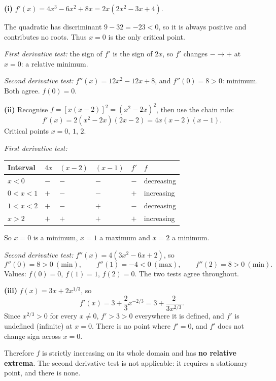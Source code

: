 \begin{solution}
\textbf{(i)} $f'(x)=4x^{3}-6x^{2}+8x=2x\left(2x^{2}-3x+4\right)$.

The quadratic has discriminant $9-32=-23<0$, so it is always positive and
contributes no roots. Thus $x=0$ is the only critical point.

\emph{First derivative test:} the sign of $f'$ is the sign of $2x$, so $f'$
changes $-\to+$ at $x=0$: a relative minimum.

\emph{Second derivative test:} $f''(x)=12x^{2}-12x+8$, and $f''(0)=8>0$:
minimum. Both agree. $f(0)=0$.

\medskip
\textbf{(ii)} Recognise $f=\left[x(x-2)\right]^{2}=(x^{2}-2x)^{2}$, then use the
chain rule:
\[
f'(x)=2(x^{2}-2x)(2x-2)=4x(x-2)(x-1).
\]
Critical points $x=0,\,1,\,2$.

\emph{First derivative test:}
\begin{center}
\small\sffamily
\begin{tabular}{@{}C{2.6cm} C{1.6cm} C{1.8cm} C{1.8cm} C{2.0cm} C{2.6cm}@{}}
\toprule
Interval & $4x$ & $(x-2)$ & $(x-1)$ & $f'$ & $f$ \\
\midrule
$x<0$     & $-$ & $-$ & $-$ & $-$ & decreasing \\
$0<x<1$   & $+$ & $-$ & $-$ & $+$ & increasing \\
$1<x<2$   & $+$ & $-$ & $+$ & $-$ & decreasing \\
$x>2$     & $+$ & $+$ & $+$ & $+$ & increasing \\
\bottomrule
\end{tabular}
\end{center}
So $x=0$ is a minimum, $x=1$ a maximum and $x=2$ a minimum.

\emph{Second derivative test:} $f''(x)=4\left(3x^{2}-6x+2\right)$, so
\[
f''(0)=8>0 \ (\text{min}),\qquad
f''(1)=-4<0 \ (\text{max}),\qquad
f''(2)=8>0 \ (\text{min}).
\]
Values: $f(0)=0$, $f(1)=1$, $f(2)=0$. The two tests agree throughout.

\medskip
\textbf{(iii)} $f(x)=3x+2x^{1/3}$, so
\[
f'(x)=3+\frac{2}{3}x^{-2/3}=3+\frac{2}{3x^{2/3}} .
\]
Since $x^{2/3}>0$ for every $x\neq0$, $f'>3>0$ everywhere it is defined, and
$f'$ is undefined (infinite) at $x=0$. There is no point where $f'=0$, and $f'$
does not change sign across $x=0$.

Therefore $f$ is strictly increasing on its whole domain and has \textbf{no
relative extrema}. The second derivative test is not applicable: it requires a
stationary point, and there is none.


\end{solution}
